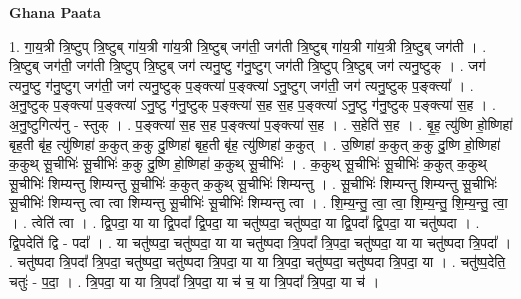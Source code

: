 \documentclass[17pt]{extarticle}
\begin{document}
\textbf{Ghana Paata } \newline

1. गा॒य॒त्री त्रि॒ष्टुप् त्रि॒ष्टुब् गा॑य॒त्री गा॑य॒त्री त्रि॒ष्टुब् जग॑ती॒ जग॑ती त्रि॒ष्टुब् गा॑य॒त्री गा॑य॒त्री त्रि॒ष्टुब् जग॑ती । . त्रि॒ष्टुब् जग॑ती॒ जग॑ती त्रि॒ष्टुप् त्रि॒ष्टुब् जग॑ त्यनु॒ष्टु ग॑नु॒ष्टुग् जग॑ती त्रि॒ष्टुप् त्रि॒ष्टुब् जग॑ त्यनु॒ष्टुक् । . जग॑ त्यनु॒ष्टु ग॑नु॒ष्टुग् जग॑ती॒ जग॑ त्यनु॒ष्टुक् प॒ङ्क्त्या॑ प॒ङ्क्त्या॑ ऽनु॒ष्टुग् जग॑ती॒ जग॑ त्यनु॒ष्टुक् प॒ङ्क्त्या᳚ । . अ॒नु॒ष्टुक् प॒ङ्क्त्या॑ प॒ङ्क्त्या॑ ऽनु॒ष्टु ग॑नु॒ष्टुक् प॒ङ्क्त्या॑ स॒ह स॒ह प॒ङ्क्त्या॑ ऽनु॒ष्टु ग॑नु॒ष्टुक् प॒ङ्क्त्या॑ स॒ह । . अ॒नु॒ष्टुगित्य॑नु - स्तुक् । . प॒ङ्क्त्या॑ स॒ह स॒ह प॒ङ्क्त्या॑ प॒ङ्क्त्या॑ स॒ह । . स॒हेति॑ स॒ह । . बृ॒ह॒ त्यु॑ष्णि हो॒ष्णिहा॑ बृह॒ती बृ॑ह॒ त्यु॑ष्णिहा॑ क॒कुत् क॒कु दु॒ष्णिहा॑ बृह॒ती बृ॑ह॒ त्यु॑ष्णिहा॑ क॒कुत् । . उ॒ष्णिहा॑ क॒कुत् क॒कु दु॒ष्णि हो॒ष्णिहा॑ क॒कुथ् सू॒चीभिः॑ सू॒चीभिः॑ क॒कु दु॒ष्णि हो॒ष्णिहा॑ क॒कुथ् सू॒चीभिः॑ । . क॒कुथ् सू॒चीभिः॑ सू॒चीभिः॑ क॒कुत् क॒कुथ् सू॒चीभिः॑ शिम्यन्तु शिम्यन्तु सू॒चीभिः॑ क॒कुत् क॒कुथ् सू॒चीभिः॑ शिम्यन्तु । . सू॒चीभिः॑ शिम्यन्तु शिम्यन्तु सू॒चीभिः॑ सू॒चीभिः॑ शिम्यन्तु त्वा त्वा शिम्यन्तु सू॒चीभिः॑ सू॒चीभिः॑ शिम्यन्तु त्वा । . शि॒म्य॒न्तु॒ त्वा॒ त्वा॒ शि॒म्य॒न्तु॒ शि॒म्य॒न्तु॒ त्वा॒ । . त्वेति॑ त्वा । . द्वि॒पदा॒ या या द्वि॒पदा᳚ द्वि॒पदा॒ या चतु॑ष्पदा॒ चतु॑ष्पदा॒ या द्वि॒पदा᳚ द्वि॒पदा॒ या चतु॑ष्पदा । . द्वि॒पदेति॑ द्वि - पदा᳚ । . या चतु॑ष्पदा॒ चतु॑ष्पदा॒ या या चतु॑ष्पदा त्रि॒पदा᳚ त्रि॒पदा॒ चतु॑ष्पदा॒ या या चतु॑ष्पदा त्रि॒पदा᳚ । . चतु॑ष्पदा त्रि॒पदा᳚ त्रि॒पदा॒ चतु॑ष्पदा॒ चतु॑ष्पदा त्रि॒पदा॒ या या त्रि॒पदा॒ चतु॑ष्पदा॒ चतु॑ष्पदा त्रि॒पदा॒ या । . चतु॑ष्प॒देति॒ चतुः॑ - प॒दा॒ । . त्रि॒पदा॒ या या त्रि॒पदा᳚ त्रि॒पदा॒ या च॑ च॒ या त्रि॒पदा᳚ त्रि॒पदा॒ या च॑ । \newline
\end{document}
